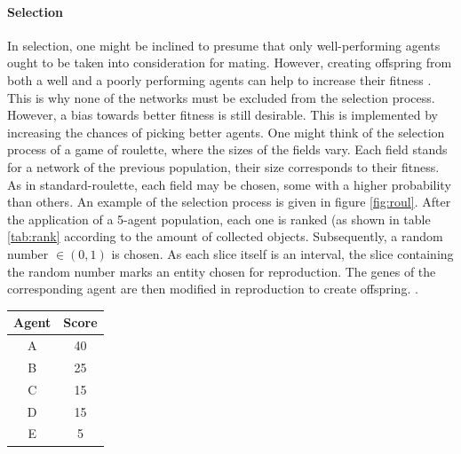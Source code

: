 \documentclass[10pt,a4paper,DIV=11]{scrreprt}
\begin{document}
\paragraph{Selection}
In selection, one might be inclined to presume that only well-performing agents ought to be taken into consideration for mating. However, creating
offspring from both a well and a poorly performing agents can help to increase their fitness \cite{KIKLAR}. This is why none
of the networks must be excluded from the selection process. However, a bias towards better fitness is still desirable. This is implemented by 
increasing the chances of picking better agents. One might think of the selection process of a game of roulette, where the sizes of the
fields vary. Each field stands for a network of the previous population, their size corresponds to their fitness. As in standard-roulette, each
field may be chosen, some with a higher probability than others. An example of the selection process is given in figure \ref{fig:roul}. After the 
application of a 5-agent population, each one is ranked (as shown in table \ref{tab:rank} according to the amount of collected objects. Subsequently,
a random number $\in (0,1)$ is chosen. As each slice itself is an interval, the slice containing the random number marks an entity chosen for 
reproduction. The genes of the corresponding agent are then modified in reproduction to create offspring. \textbf{}.
  
\begin{minipage}{\textwidth}
  \begin{minipage}[b]{0.49\textwidth}
    \centering
        \label{fig:roul}
  \end{minipage}
  \hfill
  \begin{minipage}[b]{0.49\textwidth}
    \centering
      \begin{tabular}{|c|c|} \hline
         Agent & Score \\ \hline
         A & 40 \\ \hline
         B & 25 \\ \hline
         C & 15 \\ \hline
         D & 15 \\ \hline
         E & 5  \\ \hline
      \end{tabular}
          \label{tab:rank}
    \end{minipage}
  \end{minipage}
\end{document}
